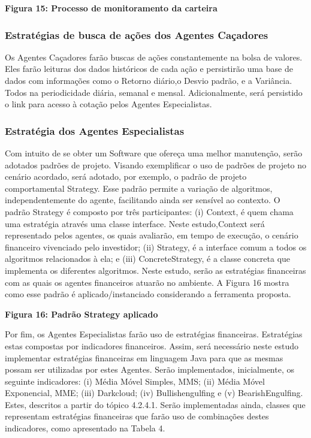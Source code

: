 \textbf{Figura 15: Processo de monitoramento da carteira}

\subsubsection{Estratégias de busca de ações dos Agentes Caçadores}

Os Agentes Caçadores farão buscas de ações constantemente na bolsa de valores. Eles farão leituras dos dados históricos de cada ação e persistirão uma base de dados com informações como o Retorno diário,o Desvio padrão, e a Variância. Todos na periodicidade diária, semanal e mensal. Adicionalmente, será persistido  o link para acesso à cotação pelos Agentes Especialistas.

\subsubsection{Estratégia dos Agentes Especialistas}

Com intuito de se obter um Software que ofereça uma melhor manutenção, serão adotados padrões de projeto. Visando exemplificar o uso de padrões de projeto no cenário acordado, será adotado, por exemplo, o padrão de projeto comportamental Strategy. Esse padrão permite a variação de algoritmos, independentemente do agente, facilitando ainda ser sensível ao contexto. O padrão Strategy é composto por três participantes: (i) Context, é quem chama uma estratégia através uma classe interface. Neste estudo,Context será representado pelos agentes, os quais avaliarão, em tempo de execução, o cenário financeiro vivenciado pelo investidor; (ii) Strategy, é a interface comum a todos os algoritmos relacionados à ela; e (iii) ConcreteStrategy, é a classe concreta que implementa os diferentes algoritmos. Neste estudo, serão as estratégias financeiras com as quais os agentes financeiros atuarão no ambiente. A Figura 16 mostra como esse padrão é aplicado/instanciado considerando a ferramenta proposta.

\textbf{Figura 16: Padrão Strategy aplicado}

Por fim, os Agentes Especialistas farão uso de estratégias financeiras. Estratégias estas compostas por indicadores financeiros. Assim, será necessário neste estudo implementar estratégias financeiras em linguagem Java para que as mesmas possam ser utilizadas por estes Agentes.  Serão implementados, inicialmente, os seguinte indicadores: (i) Média Móvel Simples, MMS; (ii) Média Móvel Exponencial, MME; (iii) Darkcloud; (iv) Bullishengulfing  e (v) BearishEngulfing. Estes, descritos a partir do tópico 4.2.4.1. Serão implementadas ainda, classes que representam estratégias financeiras que farão uso de combinações destes indicadores, como apresentado na Tabela 4.

